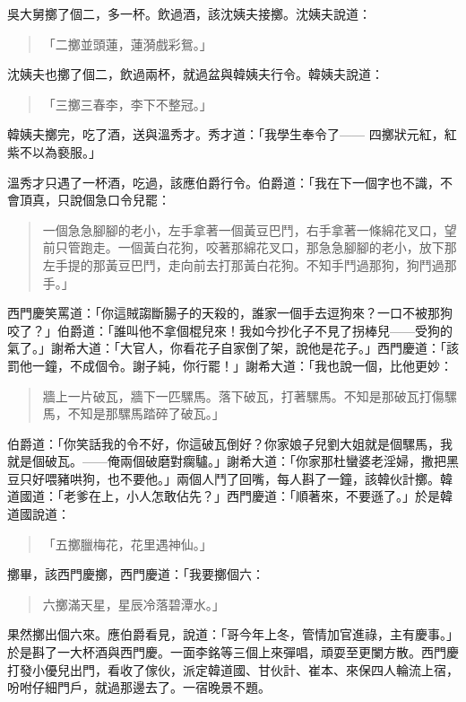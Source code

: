 吳大舅擲了個二，多一杯。飲過酒，該沈姨夫接擲。沈姨夫說道：
\begin{quote}
「二擲並頭蓮，蓮漪戲彩鴛。」
\end{quote}

沈姨夫也擲了個二，飲過兩杯，就過盆與韓姨夫行令。韓姨夫說道：
\begin{quote}
「三擲三春李，李下不整冠。」
\end{quote}

韓姨夫擲完，吃了酒，送與溫秀才。秀才道：「我學生奉令了——
四擲狀元紅，紅紫不以為褻服。」

溫秀才只遇了一杯酒，吃過，該應伯爵行令。伯爵道：「我在下一個字也不識，不會頂真，只說個急口令兒罷：
\begin{quote}
一個急急腳腳的老小，左手拿著一個黃豆巴鬥，右手拿著一條綿花叉口，望前只管跑走。一個黃白花狗，咬著那綿花叉口，那急急腳腳的老小，放下那左手提的那黃豆巴鬥，走向前去打那黃白花狗。不知手鬥過那狗，狗鬥過那手。」
\end{quote}

西門慶笑罵道：「你這賊謅斷腸子的天殺的，誰家一個手去逗狗來？一口不被那狗咬了？」伯爵道：「誰叫他不拿個棍兒來！我如今抄化子不見了拐棒兒——受狗的氣了。」謝希大道：「大官人，你看花子自家倒了架，說他是花子。」西門慶道：「該罰他一鐘，不成個令。謝子純，你行罷！」謝希大道：「我也說一個，比他更妙：
\begin{quote}
牆上一片破瓦，牆下一匹騾馬。落下破瓦，打著騾馬。不知是那破瓦打傷騾馬，不知是那騾馬踏碎了破瓦。」
\end{quote}

伯爵道：「你笑話我的令不好，你這破瓦倒好？你家娘子兒劉大姐就是個騾馬，我就是個破瓦。——俺兩個破磨對瘸驢。」謝希大道：「你家那杜蠻婆老淫婦，撒把黑豆只好喂豬哄狗，也不要他。」兩個人鬥了回嘴，每人斟了一鐘，該韓伙計擲。韓道國道：「老爹在上，小人怎敢佔先？」西門慶道：「順著來，不要遜了。」於是韓道國說道：
\begin{quote}
「五擲臘梅花，花里遇神仙。」
\end{quote}

擲畢，該西門慶擲，西門慶道：「我要擲個六：
\begin{quote}
六擲滿天星，星辰冷落碧潭水。」
\end{quote}

果然擲出個六來。應伯爵看見，說道：「哥今年上冬，管情加官進祿，主有慶事。」於是斟了一大杯酒與西門慶。一面李銘等三個上來彈唱，頑耍至更闌方散。西門慶打發小優兒出門，看收了傢伙，派定韓道國、甘伙計、崔本、來保四人輪流上宿，吩咐仔細門戶，就過那邊去了。一宿晚景不題。

